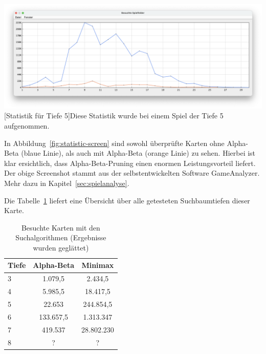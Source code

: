 \vspace{1em}
\begin{minipage}{\linewidth}
    \centering
    \includegraphics[width=0.9\linewidth]{statistic/Test-D5-01/ST-01-D5-LD}
    [Statistik für Tiefe 5]{Diese Statistik wurde bei einem Spiel der Tiefe 5 aufgenommen.}
    \label{fig:statistic-screen}
\end{minipage}

In Abbildung~\ref{fig:statistic-screen} sind sowohl \"uberpr\"ufte Karten ohne Alpha-Beta (blaue Linie), als auch mit Alpha-Beta (orange Linie) zu sehen.
Hierbei ist klar ersichtlich, dass Alpha-Beta-Pruning einen enormen Leistungsvorteil liefert.
Der obige Screenshot stammt aus der selbstentwickelten Software GameAnalyzer.
Mehr dazu in Kapitel~\ref{sec:spielanalyse}.

Die Tabelle~\ref{tab:search-depth} liefert eine \"Ubersicht \"uber alle getesteten Suchbaumtiefen dieser Karte.

\vspace{1em}
\begin{table}[!h]
    \centering
    \begin{tabular}{|l|c|c|}
        \hline
        \textbf{Tiefe} & \textbf{Alpha-Beta} & \textbf{Minimax}\\
        \hline
        3 & 1.079,5 & 2.434,5\\
        \hline
        4 & 5.985,5 & 18.417,5\\
        \hline
        5 & 22.653 & 244.854,5\\
        \hline
        6 & 133.657,5 & 1.313.347\\
        \hline
        7 & 419.537 & 28.802.230\\
        \hline
        8 & ? & ?\\
        \hline
    \end{tabular}
    \caption{Besuchte Karten mit den Suchalgorithmen (Ergebnisse wurden geglättet)}
    \label{tab:search-depth}
\end{table}

